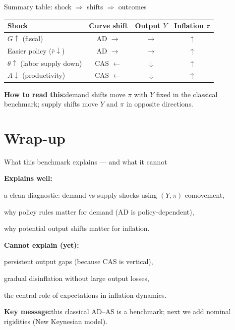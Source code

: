 \documentclass[aspectratio=169,xcolor=dvipsnames]{beamer}
\let\tempone\itemize
\let\temptwo\enditemize
\renewenvironment{itemize}{\tempone\addtolength{\itemsep}{\fill}}{\temptwo}
\begin{document}
\begin{frame}{Summary table: shock $\Rightarrow$ shifts $\Rightarrow$ outcomes}
\small
\begin{center}
\begin{tabular}{lccc}
\toprule
\textbf{Shock} & \textbf{Curve shift} & \textbf{Output $Y$} & \textbf{Inflation $\pi$} \\
\midrule
$G\uparrow$ (fiscal)          & AD $\rightarrow$   & $\rightarrow$ & $\uparrow$ \\
Easier policy ($\bar r\downarrow$) & AD $\rightarrow$   & $\rightarrow$ & $\uparrow$ \\
$\theta\uparrow$ (labor supply down) & CAS $\leftarrow$ & $\downarrow$ & $\uparrow$ \\
$A\downarrow$ (productivity) & CAS $\leftarrow$     & $\downarrow$ & $\uparrow$ \\
\bottomrule
\end{tabular}
\end{center}

\vspace{0.2em}
\textbf{How to read this:}\quad demand shifts move $\pi$ with $Y$ fixed in the classical benchmark;\;
supply shifts move $Y$ and $\pi$ in opposite directions.
\end{frame}

\section{Wrap-up}

\begin{frame}{What this benchmark explains --- and what it cannot}
\begin{itemize}
\item \textbf{Explains well:}
\begin{itemize}
\item a clean diagnostic: demand vs supply shocks using $(Y,\pi)$ comovement,
\item why policy rules matter for demand (AD is policy-dependent),
\item why potential output shifts matter for inflation.
\end{itemize}
\item \textbf{Cannot explain (yet):}
\begin{itemize}
\item persistent output gaps (because CAS is vertical),
\item gradual disinflation without large output losses,
\item the central role of expectations in inflation dynamics.
\end{itemize}
\end{itemize}

\vspace{0.3em}
\textbf{Key message:}\quad this classical AD--AS is a benchmark; next we add nominal rigidities (New Keynesian model).
\end{frame}
\end{document}
